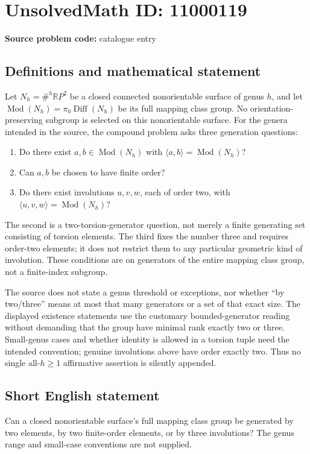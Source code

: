 \documentclass[11pt]{article}
\newcommand{\R}{\mathbb{R}}
\begin{document}
\section*{UnsolvedMath ID: 11000119}
\textbf{Source problem code:} catalogue entry
\subsection{Definitions and mathematical statement}
Let \(N_h=\#^h\R P^2\) be a closed connected nonorientable surface of genus \(h\), and let \(\operatorname{Mod}(N_h)=\pi_0\operatorname{Diff}(N_h)\) be its full mapping class group. No orientation-preserving subgroup is selected on this nonorientable surface. For the genera intended in the source, the compound problem asks three generation questions:
\begin{enumerate}
\item Do there exist \(a,b\in\operatorname{Mod}(N_h)\) with \(\langle a,b\rangle=\operatorname{Mod}(N_h)\)?
\item Can \(a,b\) be chosen to have finite order?
\item Do there exist involutions \(u,v,w\), each of order two, with \(\langle u,v,w\rangle=\operatorname{Mod}(N_h)\)?
\end{enumerate}
The second is a two-torsion-generator question, not merely a finite generating set consisting of torsion elements. The third fixes the number three and requires order-two elements; it does not restrict them to any particular geometric kind of involution. These conditions are on generators of the entire mapping class group, not a finite-index subgroup.

The source does not state a genus threshold or exceptions, nor whether ``by two/three'' means at most that many generators or a set of that exact size. The displayed existence statements use the customary bounded-generator reading without demanding that the group have minimal rank exactly two or three. Small-genus cases and whether identity is allowed in a torsion tuple need the intended convention; genuine involutions above have order exactly two. Thus no single all-\(h\geq1\) affirmative assertion is silently appended.
\subsection{Short English statement}
Can a closed nonorientable surface's full mapping class group be generated by two elements, by two finite-order elements, or by three involutions? The genus range and small-case conventions are not supplied.
\end{document}
